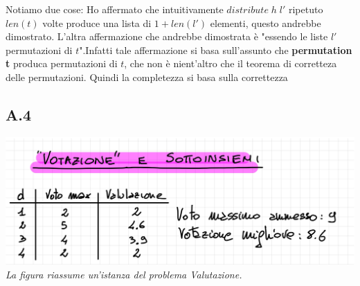 \documentclass[a4paper]{article}
\begin{document}
Notiamo due cose:
Ho affermato che intuitivamente $distribute \; h \; l'$ ripetuto $len(t)$ volte produce una lista di $ 1 + len(l')$ elementi, questo andrebbe dimostrato.
L'altra affermazione che andrebbe dimostrata è "essendo le liste $l'$ permutazioni di $t$".Infatti tale affermazione si basa sull'assunto che \textbf{permutation t} produca permutazioni di $t$, che non è nient'altro che il teorema di corretteza delle permutazioni.
Quindi la completezza si basa sulla correttezza
\subsection{A.4}
\includegraphics[width=\textwidth]{./img/A4}
\emph{La figura riassume un’istanza del problema Valutazione.}
\end{document}

